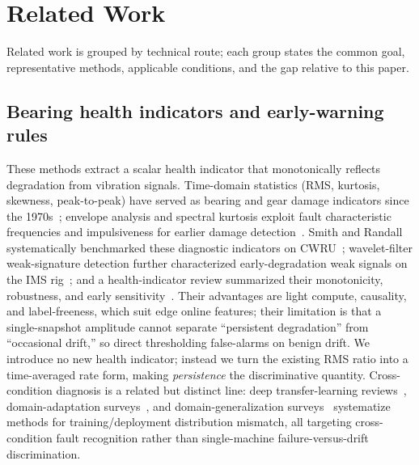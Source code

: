 \documentclass[journal]{IEEEtran}
\begin{document}
\section{Related Work}\label{sec:related}

Related work is grouped by technical route; each group states the common goal, representative methods, applicable conditions, and the gap relative to this paper.

\subsection{Bearing health indicators and early-warning rules}
These methods extract a scalar health indicator that monotonically reflects degradation from vibration signals. Time-domain statistics (RMS, kurtosis, skewness, peak-to-peak) have served as bearing and gear damage indicators since the 1970s~\cite{dyer1978}; envelope analysis and spectral kurtosis exploit fault characteristic frequencies and impulsiveness for earlier damage detection~\cite{antoni2006,randall2011}. Smith and Randall systematically benchmarked these diagnostic indicators on CWRU~\cite{smith2015}; wavelet-filter weak-signature detection further characterized early-degradation weak signals on the IMS rig~\cite{qiu2006}; and a health-indicator review summarized their monotonicity, robustness, and early sensitivity~\cite{wangd2018}. Their advantages are light compute, causality, and label-freeness, which suit edge online features; their limitation is that a single-snapshot amplitude cannot separate ``persistent degradation'' from ``occasional drift,'' so direct thresholding false-alarms on benign drift. We introduce no new health indicator; instead we turn the existing RMS ratio into a time-averaged rate form, making \emph{persistence} the discriminative quantity. Cross-condition diagnosis is a related but distinct line: deep transfer-learning reviews~\cite{smith2015,chen2023transfer}, domain-adaptation surveys~\cite{zhang2023domain}, and domain-generalization surveys~\cite{zhou2023dg,xiao2024dg} systematize methods for training/deployment distribution mismatch, all targeting cross-condition fault recognition rather than single-machine failure-versus-drift discrimination.
\end{document}
